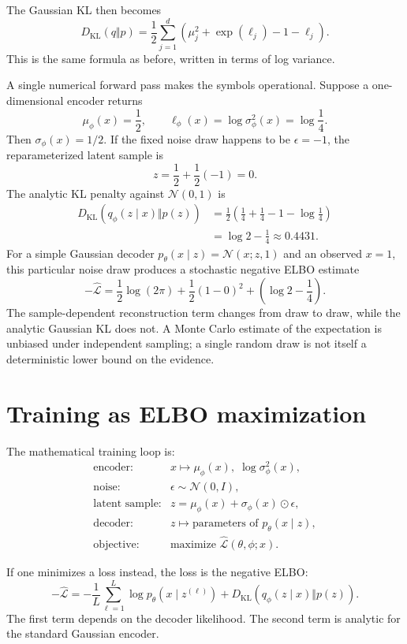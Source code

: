 The Gaussian KL then becomes
\[
  D_{\mathrm{KL}}(q\Vert p)
  =\frac12\sum_{j=1}^d
  \left(
  \mu_j^2+\exp(\ell_j)-1-\ell_j
  \right).
\]
This is the same formula as before, written in terms of log variance.

A single numerical forward pass makes the symbols operational. Suppose a one-dimensional encoder returns
\[
 \mu_\phi(x)=\frac12,\qquad
 \ell_\phi(x)=\log\sigma_\phi^2(x)=\log\frac14.
\]
Then $\sigma_\phi(x)=1/2$. If the fixed noise draw happens to be $\epsilon=-1$, the reparameterized latent sample is
\[
 z=\frac12+\frac12(-1)=0.
\]
The analytic KL penalty against $\mathcal N(0,1)$ is
\[
 \begin{aligned}
 D_{\mathrm{KL}}(q_\phi(z\mid x)\Vert p(z))
 &=\frac12\left(\frac14+\frac14-1-\log\frac14\right)\\
 &=\boxed{\log2-\frac14\approx0.4431}.
 \end{aligned}
\]
For a simple Gaussian decoder $p_\theta(x\mid z)=\mathcal N(x;z,1)$ and an observed $x=1$, this particular noise draw produces a stochastic negative ELBO estimate
\[
 -\widehat{\mathcal L}
 =\frac12\log(2\pi)+\frac12(1-0)^2+
  \left(\log2-\frac14\right).
\]
The sample-dependent reconstruction term changes from draw to draw, while the analytic Gaussian KL does not. A Monte Carlo estimate of the expectation is unbiased under independent sampling; a single random draw is not itself a deterministic lower bound on the evidence.

\section{Training as ELBO maximization}

The mathematical training loop is:
\[
\begin{array}{ll}
\text{encoder:} & x\mapsto \mu_\phi(x),\;\log\sigma_\phi^2(x),\\
\text{noise:} & \epsilon\sim\mathcal N(0,I),\\
\text{latent sample:} & z=\mu_\phi(x)+\sigma_\phi(x)\odot\epsilon,\\
\text{decoder:} & z\mapsto \text{parameters of }p_\theta(x\mid z),\\
\text{objective:} & \text{maximize }\widehat{\mathcal L}(\theta,\phi;x).
\end{array}
\]

If one minimizes a loss instead, the loss is the negative ELBO:
\[
  -\widehat{\mathcal L}
  =-\frac1L\sum_{\ell=1}^L\log p_\theta(x\mid z^{(\ell)})
  +D_{\mathrm{KL}}(q_\phi(z\mid x)\Vert p(z)).
\]
The first term depends on the decoder likelihood.  The second term is analytic for the standard Gaussian encoder.

